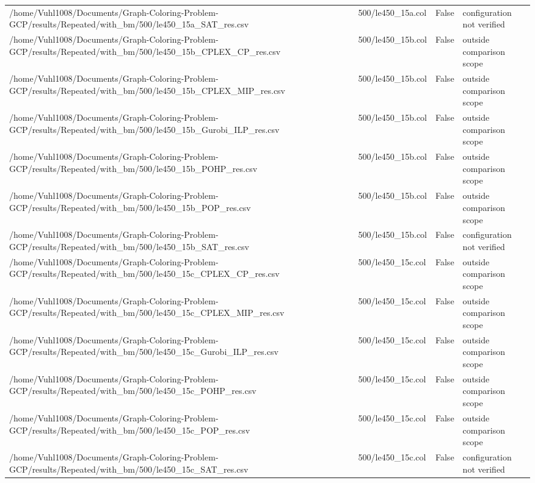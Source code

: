 \begin{table}[htbp]
\begin{tabular}{llll}
/home/Vuhl1008/Documents/Graph-Coloring-Problem-GCP/results/Repeated/with\_bm/500/le450\_15a\_SAT\_res.csv & 500/le450\_15a.col & False & configuration not verified \\
/home/Vuhl1008/Documents/Graph-Coloring-Problem-GCP/results/Repeated/with\_bm/500/le450\_15b\_CPLEX\_CP\_res.csv & 500/le450\_15b.col & False & outside comparison scope \\
/home/Vuhl1008/Documents/Graph-Coloring-Problem-GCP/results/Repeated/with\_bm/500/le450\_15b\_CPLEX\_MIP\_res.csv & 500/le450\_15b.col & False & outside comparison scope \\
/home/Vuhl1008/Documents/Graph-Coloring-Problem-GCP/results/Repeated/with\_bm/500/le450\_15b\_Gurobi\_ILP\_res.csv & 500/le450\_15b.col & False & outside comparison scope \\
/home/Vuhl1008/Documents/Graph-Coloring-Problem-GCP/results/Repeated/with\_bm/500/le450\_15b\_POHP\_res.csv & 500/le450\_15b.col & False & outside comparison scope \\
/home/Vuhl1008/Documents/Graph-Coloring-Problem-GCP/results/Repeated/with\_bm/500/le450\_15b\_POP\_res.csv & 500/le450\_15b.col & False & outside comparison scope \\
/home/Vuhl1008/Documents/Graph-Coloring-Problem-GCP/results/Repeated/with\_bm/500/le450\_15b\_SAT\_res.csv & 500/le450\_15b.col & False & configuration not verified \\
/home/Vuhl1008/Documents/Graph-Coloring-Problem-GCP/results/Repeated/with\_bm/500/le450\_15c\_CPLEX\_CP\_res.csv & 500/le450\_15c.col & False & outside comparison scope \\
/home/Vuhl1008/Documents/Graph-Coloring-Problem-GCP/results/Repeated/with\_bm/500/le450\_15c\_CPLEX\_MIP\_res.csv & 500/le450\_15c.col & False & outside comparison scope \\
/home/Vuhl1008/Documents/Graph-Coloring-Problem-GCP/results/Repeated/with\_bm/500/le450\_15c\_Gurobi\_ILP\_res.csv & 500/le450\_15c.col & False & outside comparison scope \\
/home/Vuhl1008/Documents/Graph-Coloring-Problem-GCP/results/Repeated/with\_bm/500/le450\_15c\_POHP\_res.csv & 500/le450\_15c.col & False & outside comparison scope \\
/home/Vuhl1008/Documents/Graph-Coloring-Problem-GCP/results/Repeated/with\_bm/500/le450\_15c\_POP\_res.csv & 500/le450\_15c.col & False & outside comparison scope \\
/home/Vuhl1008/Documents/Graph-Coloring-Problem-GCP/results/Repeated/with\_bm/500/le450\_15c\_SAT\_res.csv & 500/le450\_15c.col & False & configuration not verified \\

\end{tabular}
\end{table}

